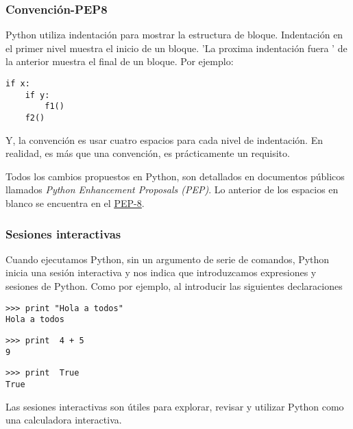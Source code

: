 \documentclass[10pt]{beamer}
\begin{document}
\begin{frame}[fragile]
\frametitle{Convenci\'on-PEP8}
Python utiliza indentaci\'on para mostrar la estructura de bloque. Indentaci\'on en el primer nivel muestra el inicio de un bloque. 'La proxima  indentaci\'on fuera ' de la anterior  muestra  el final de un bloque. Por ejemplo: 

\vspace{0.2cm}


\begin{lstlisting}
if x:
    if y:
        f1()
    f2()
\end{lstlisting}

\vspace{0.3cm}

Y, la convenci\'on es usar cuatro espacios para cada nivel de indentaci\'on. En realidad, es m\'as que una convenci\'on, es pr\'acticamente un requisito.

\vspace{0.3cm}

Todos los cambios propuestos en Python, son detallados en documentos p\'ublicos llamados \textit{Python Enhancement Proposals (PEP)}. Lo anterior de los espacios en blanco se encuentra en el \href{http://www.python.org/dev/peps/pep-0008/}{\underline{PEP-8}}.
\end{frame}


\begin{frame}[fragile]
\frametitle{Sesiones interactivas}

\vspace{0.3cm}

Cuando ejecutamos Python, sin un argumento de serie de comandos, Python inicia una sesi\'on interactiva y nos indica que introduzcamos expresiones y sesiones de Python.  Como por ejemplo, al introducir las siguientes declaraciones


\vspace{0.2cm}

\begin{lstlisting}
>>> print "Hola a todos"
Hola a todos
\end{lstlisting}



\begin{lstlisting}
>>> print  4 + 5
9
\end{lstlisting}

\begin{lstlisting}
>>> print  True
True
\end{lstlisting}

\vspace{0.2cm}

Las sesiones interactivas son \'utiles para explorar, revisar y utilizar Python como una calculadora interactiva.

\end{frame}
\end{document}
